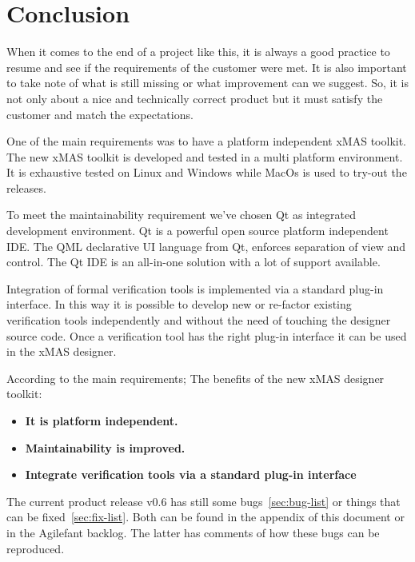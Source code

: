 \chapter*{Conclusion}

When it comes to the end of a project like this, it is always a good practice to
resume and see if the requirements of the customer were met. It is also
important to take note of what is still missing or what improvement can we
suggest. So, it is not only about a nice and technically correct product but it
must satisfy the customer and match the expectations.


One of the main requirements was to have a platform independent xMAS
toolkit. The new xMAS toolkit is developed and tested in a multi platform
environment. It is exhaustive tested on Linux and Windows while MacOs is used to
try-out the releases.

To meet the maintainability requirement we've chosen Qt as integrated
development environment. Qt is a powerful open source platform independent IDE.
The QML declarative UI language from Qt, enforces separation of view and control. The
Qt IDE is an all-in-one solution with a lot of support available.


Integration of formal verification tools is implemented via a standard plug-in
interface. In this way it is possible to develop new or re-factor existing
verification tools independently and without the need of touching the designer
source code. Once a verification tool has the right plug-in interface it can be
used in the xMAS designer.


\vspace{0.5 cm}

\begin{tcolorbox}[colback=white]
According to the main requirements; The benefits of the new xMAS designer toolkit:
\begin{itemize}
\item \textbf{It is platform independent.}
\item \textbf{Maintainability is improved.}
\item \textbf{Integrate verification tools via a standard plug-in interface}
\end{itemize}
\end{tcolorbox}

The current product release v0.6 has still some bugs~\ref{sec:bug-list} or
things that can be fixed~\ref{sec:fix-list}. Both can be found in the appendix
of this document or in the Agilefant backlog. The latter has comments of how
these bugs can be reproduced.

